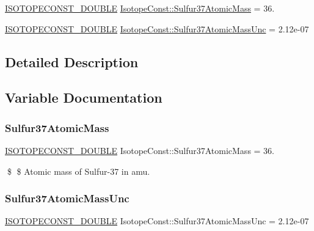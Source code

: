 \begin{DoxyCompactItemize}
\item 
\mbox{\hyperlink{group___isotope_const-_macros_ga8f45a7272ce02c0b4c65c44636ed719a}{I\+S\+O\+T\+O\+P\+E\+C\+O\+N\+S\+T\+\_\+\+D\+O\+U\+B\+LE}} \mbox{\hyperlink{group___isotope_const-_sulfur-_s37_gab210068e92520d57817babd773d0c881}{Isotope\+Const\+::\+Sulfur37\+Atomic\+Mass}} = 36.
\item 
\mbox{\hyperlink{group___isotope_const-_macros_ga8f45a7272ce02c0b4c65c44636ed719a}{I\+S\+O\+T\+O\+P\+E\+C\+O\+N\+S\+T\+\_\+\+D\+O\+U\+B\+LE}} \mbox{\hyperlink{group___isotope_const-_sulfur-_s37_ga0ee9f2dea710696e5807046ff73c2fea}{Isotope\+Const\+::\+Sulfur37\+Atomic\+Mass\+Unc}} = 2.\+12e-\/07
\end{DoxyCompactItemize}


\subsection{Detailed Description}


\subsection{Variable Documentation}
\mbox{\label{group___isotope_const-_sulfur-_s37_gab210068e92520d57817babd773d0c881}} 
\subsubsection{\texorpdfstring{Sulfur37\+Atomic\+Mass}{Sulfur37AtomicMass}}
{\footnotesize\ttfamily \mbox{\hyperlink{group___isotope_const-_macros_ga8f45a7272ce02c0b4c65c44636ed719a}{I\+S\+O\+T\+O\+P\+E\+C\+O\+N\+S\+T\+\_\+\+D\+O\+U\+B\+LE}} Isotope\+Const\+::\+Sulfur37\+Atomic\+Mass = 36.}

\$ \$ Atomic mass of Sulfur-\/37 in amu. \mbox{\label{group___isotope_const-_sulfur-_s37_ga0ee9f2dea710696e5807046ff73c2fea}} 
\subsubsection{\texorpdfstring{Sulfur37\+Atomic\+Mass\+Unc}{Sulfur37AtomicMassUnc}}
{\footnotesize\ttfamily \mbox{\hyperlink{group___isotope_const-_macros_ga8f45a7272ce02c0b4c65c44636ed719a}{I\+S\+O\+T\+O\+P\+E\+C\+O\+N\+S\+T\+\_\+\+D\+O\+U\+B\+LE}} Isotope\+Const\+::\+Sulfur37\+Atomic\+Mass\+Unc = 2.\+12e-\/07}

